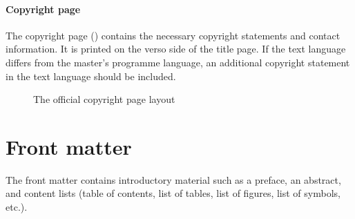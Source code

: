 \documentclass[11pt,article,oneside,a4paper]{memoir}
\begin{document}
\paragraph{Copyright page}
The copyright page () contains the necessary copyright
statements and contact information. It is printed on the verso side of the
title page. If the text language differs from the master's programme language,
an additional copyright statement in the text language should be included.
\begin{figure}
  \centering \fboxsep=0pt
  \caption{The official copyright page layout}
  \label{fig:copyright}
\end{figure}

\section{Front matter}
The front matter contains introductory material such as a preface, an
abstract, and content lists (table of contents, list of tables, list of
figures, list of symbols, etc.).
\end{document}
